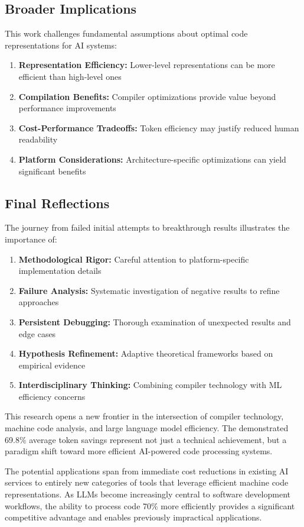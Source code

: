 \documentclass[11pt,a4paper]{article}
\begin{document}
\subsection{Broader Implications}
This work challenges fundamental assumptions about optimal code representations for AI systems:

\begin{enumerate}
    \item \textbf{Representation Efficiency:} Lower-level representations can be more efficient than high-level ones
    \item \textbf{Compilation Benefits:} Compiler optimizations provide value beyond performance improvements
    \item \textbf{Cost-Performance Tradeoffs:} Token efficiency may justify reduced human readability
    \item \textbf{Platform Considerations:} Architecture-specific optimizations can yield significant benefits
\end{enumerate}

\subsection{Final Reflections}
The journey from failed initial attempts to breakthrough results illustrates the importance of:
\begin{enumerate}
    \item \textbf{Methodological Rigor:} Careful attention to platform-specific implementation details
    \item \textbf{Failure Analysis:} Systematic investigation of negative results to refine approaches
    \item \textbf{Persistent Debugging:} Thorough examination of unexpected results and edge cases
    \item \textbf{Hypothesis Refinement:} Adaptive theoretical frameworks based on empirical evidence
    \item \textbf{Interdisciplinary Thinking:} Combining compiler technology with ML efficiency concerns
\end{enumerate}

This research opens a new frontier in the intersection of compiler technology, machine code analysis, and large language model efficiency. The demonstrated 69.8\% average token savings represent not just a technical achievement, but a paradigm shift toward more efficient AI-powered code processing systems.

The potential applications span from immediate cost reductions in existing AI services to entirely new categories of tools that leverage efficient machine code representations. As LLMs become increasingly central to software development workflows, the ability to process code 70\% more efficiently provides a significant competitive advantage and enables previously impractical applications.
\end{document}
